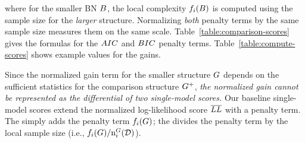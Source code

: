 \documentclass{article}
\begin{document}
where for the smaller BN $B$, the local complexity $f_{i}(B)$ is computed 
using the sample size for the {\em larger}  structure. Normalizing {\em both} penalty terms by the same sample size measures them on the same scale. 
Table~\ref{table:comparison-scores} gives the formulas for the $AIC$ and $BIC$  penalty terms. 
Table~\ref{table:compute-scores} shows example values for the gains. 

Since the normalized gain term for the smaller structure $G$ depends on the sufficient statistics for the comparison structure $G^{+}$, {\em the normalized gain cannot be represented as the differential of two single-model scores.} Our baseline single-model scores extend the normalized log-likelihood score $\overline{LL}$ %
with a penalty term. The  simply adds the penalty term $f_{i}(G)$; the  divides the penalty term by the local sample size (i.e., $f_{i}(G)/\mathrm{n}^{G}_{i}(\mathcal{D})$).

\end{document}
